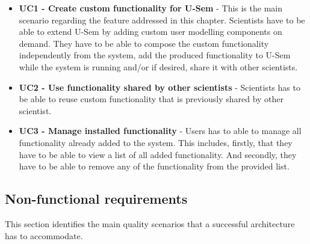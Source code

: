 \begin{itemize}

	\item \textbf{UC1 - Create custom functionality for U-Sem} - This is the main scenario regarding the feature addressed in this chapter. Scientists have to be able to extend U-Sem by adding custom user modelling components on demand. They have to be able to compose the custom functionality independently from the system, add the produced functionality to U-Sem while the system is running and/or if desired, share it with other scientists.
	
	\item \textbf{UC2 - Use functionality shared by other scientists} - Scientists has to be able to reuse custom functionality that is previously shared by other scientist.
	
	\item \textbf{UC3 - Manage installed functionality} - Users has to able to manage all functionality already added to the system. This includes, firstly, that they have to be able to view a list of all added functionality. And secondly, they have to be able to remove any of the functionality from the provided list.
			
\end{itemize}

\subsection{Non-functional requirements}

This section identifies the main quality scenarios that a successful architecture has to accommodate. 

